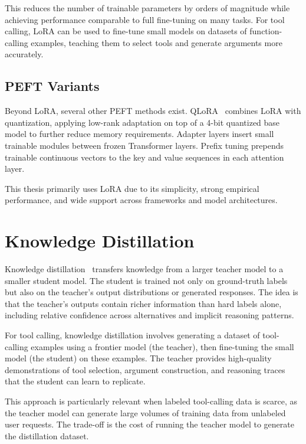 This reduces the number of trainable parameters by orders of magnitude while achieving performance comparable to full fine-tuning on many tasks. For tool calling, LoRA can be used to fine-tune small models on datasets of function-calling examples, teaching them to select tools and generate arguments more accurately.

\subsection{PEFT Variants}

Beyond LoRA, several other PEFT methods exist. QLoRA~\cite{dettmers2023qlora} combines LoRA with quantization, applying low-rank adaptation on top of a 4-bit quantized base model to further reduce memory requirements. Adapter layers insert small trainable modules between frozen Transformer layers. Prefix tuning prepends trainable continuous vectors to the key and value sequences in each attention layer.

This thesis primarily uses LoRA due to its simplicity, strong empirical performance, and wide support across frameworks and model architectures.

\section{Knowledge Distillation}

Knowledge distillation~\cite{hinton2015distilling} transfers knowledge from a larger teacher model to a smaller student model. The student is trained not only on ground-truth labels but also on the teacher's output distributions or generated responses. The idea is that the teacher's outputs contain richer information than hard labels alone, including relative confidence across alternatives and implicit reasoning patterns.

For tool calling, knowledge distillation involves generating a dataset of tool-calling examples using a frontier model (the teacher), then fine-tuning the small model (the student) on these examples. The teacher provides high-quality demonstrations of tool selection, argument construction, and reasoning traces that the student can learn to replicate.

This approach is particularly relevant when labeled tool-calling data is scarce, as the teacher model can generate large volumes of training data from unlabeled user requests. The trade-off is the cost of running the teacher model to generate the distillation dataset.

